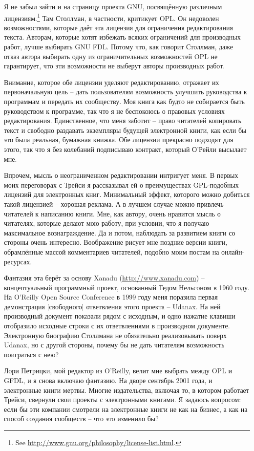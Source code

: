 Я не забыл зайти и на страницу проекта GNU, посвящённую различным лицензиям.\footnote{See \url{http://www.gnu.org/philosophy/license-list.html}.} Там Столлман, в частности, критикует OPL. Он недоволен возможностями, которые даёт эта лицензия для ограничения редактирования текста. Авторам, которые хотят избежать всяких ограничений для производных работ, лучше выбирать GNU FDL. Потому что, как говорит Столлман, даже отказ автора выбирать одну из ограничительных возможностей OPL не гарантирует, что эти возможности не выберут авторы производных работ.

Внимание, которое обе лицензии уделяют редактированию, отражает их первоначальную цель -- дать пользователям возможность улучшить руководства к программам и передать их сообществу. Моя книга как будто не собирается быть руководством к программе, так что я не беспокоюсь о правовых условиях редактирования. Единственное, что меня заботит -- право читателей копировать текст и свободно раздавать экземпляры будущей электронной книги, как если бы это была реальная, бумажная книжка. Обе лицензии прекрасно подходят для этого, так что я без колебаний подписываю контракт, который О'Рейли высылает мне.

Впрочем, мысль о неограниченном редактировании интригует меня. В первых моих переговорах с Трейси я рассказывал ей о преимуществах GPL-подобных лицензий для электронных книг. Минимальный эффект, которого можно добиться такой лицензией -- хорошая реклама. А в лучшем случае можно привлечь читателей к написанию книги. Мне, как автору, очень нравится мысль о читателях, которые делают мою работу, при условии, что я получаю максимальное вознаграждение. Да и потом, наблюдать за развитием книги со стороны очень интересно. Воображение рисует мне поздние версии книги, обрамлённые массой комментариев читателей, подобно моим постам на онлайн-ресурсах.

Фантазия эта берёт за основу Xanadu (\url{http://www.xanadu.com}) -- концептуальный программный проект, основанный Тедом Нельсоном в 1960 году. На O'Reilly Open Source Conference в 1999 году меня поразила первая демонстрация [свободного] ответвления этого проекта -- Udanax. На ней производный документ показали рядом с исходным, и одно нажатие клавиши отобразило исходные строки с их ответвлениями в производном документе. Электронную биографию Столлмана не обязательно реализовывать поверх Udanax, но с другой стороны, почему бы не дать читателям возможность поиграться с нею?

Лори Петрицки, мой редактор из O'Reilly, велит мне выбрать между OPL и GFDL, и я снова включаю фантазию. На дворе сентябрь 2001 года, и электронные книги мертвы. Многие издательства, включая то, в котором работает Трейси, свернули свои проекты с электронными книгами. Я задаюсь вопросом: если бы эти компании смотрели на электронные книги не как на бизнес, а как на способ создания сообществ -- что это изменило бы?

